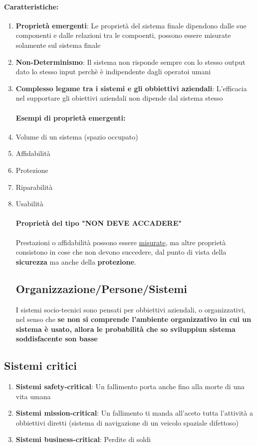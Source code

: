 \documentclass[12pt, a4paper, openany, twoside]{book}
\begin{document}
\paragraph{Caratteristiche:}
\begin{enumerate}
	\item \textbf{Proprietà emergenti}:
	Le proprietà del sistema finale dipendono dalle sue componenti e dalle 
	relazioni tra le compoenti, possono essere misurate solamente sul sistema 
	finale
	\item \textbf{Non-Determinismo}: Il sistema non risponde sempre con lo stesso
	output dato lo stesso input perchè è indipendente dagli operatoi umani
	\item \textbf{Complesso legame tra i sistemi e gli obbiettivi aziendali}: 
	L'efficacia nel supportare gli obiettivi aziendali non dipende dal sistema stesso
	\paragraph{Esempi di proprietà emergenti:}
	\item Volume di un sistema (spazio occupato)
	\item Affidabilità
	\item Protezione
	\item Riparabilità
	\item Usabilità
	\paragraph{Proprietà del tipo "NON DEVE ACCADERE"}
	Prestazioni o affidabilità possono essere \underline{misurate}, ma altre proprietà
	consistono in cose che non devono succedere, dal punto di vista della
	\textbf{sicurezza} ma anche della \textbf{protezione}. 
\subsection{Organizzazione/Persone/Sistemi}
I sistemi socio-tecnici sono pensati per obbiettivi aziendali, o organizzativi,
nel senso che \textbf{se non si comprende l'ambiente organizzativo in cui un sistema è usato,
allora le probabilità che so sviluppiun sistema soddisfacente son basse}
\end{enumerate}
\subsection{Sistemi critici}
\begin{enumerate}
	\item \textbf{Sistemi safety-critical}: Un fallimento porta anche fino 
	alla morte di una vita umana	
	\item \textbf{Sistemi mission-critical}: Un fallimento ti manda all'aceto
	tutta l'attività a obbiettivi diretti (sistema di navigazione di un veicolo
	spaziale difettoso)
	\item \textbf{Sistemi business-critical}: Perdite di soldi
\end{enumerate}
\end{document}
